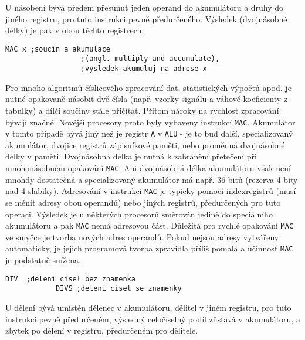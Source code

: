           U násobení bývá předem přesunut jeden operand do akumulátoru a druhý do jiného registru, 
          pro tuto instrukci pevně předurčeného. Výsledek (dvojnásobné délky) je pak v obou těchto 
          registrech.
          
          \begin{lstlisting}[style=luaMITASMStyle]
            MAC x ;soucin a akumulace 
                  ;(angl. multiply and accumulate), 
                  ;vysledek akumuluj na adrese x
          \end{lstlisting}
         
          Pro mnoho algoritmů číslicového zpracování dat, statistických výpočtů apod. je nutné
          opakovaně násobit dvě čísla (např. vzorky signálu a váhové koeficienty z tabulky) a dílčí
          součiny stále přičítat. Přitom nároky na rychlost zpracování bývají značné. Novější
          procesory proto byly vybaveny instrukcí \texttt{MAC}. Akumulátor v tomto případě bývá jiný
          než je registr \texttt{A} v \texttt{ALU} - je to buď další, specializovaný akumulátor,
          dvojice registrů zápisníkové paměti, nebo proměnná dvojnásobné délky v paměti. Dvojnásobná
          délka je nutná k zabránění přetečení při mnohonásobném opakování \texttt{MAC}. Ani
          dvojnásobná délka akumulátoru však není mnohdy dostatečná a specializovaný akumulátor má
          např. 36 bitů (rezerva 4 bity nad 4 slabiky). Adresování v instrukci \texttt{MAC} je
          typicky pomocí indexregistrů (musí se měnit adresy obou operandů) nebo jiných registrů,
          předurčených pro tuto operaci. Výsledek je u některých procesorů směrován jedině do
          speciálního akumulátoru a pak \texttt{MAC} nemá adresovou část. Důležitá pro rychlé
          opakování \texttt{MAC} ve smyčce je tvorba nových adres operandů. Pokud nejsou adresy
          vytvářeny automaticky, je jejich programová tvorba zpravidla příliš pomalá a účinnost
          \texttt{MAC} je podstatně snížena.
         
          \begin{lstlisting}[style=luaMITASMStyle]
            DIV  ;deleni cisel bez znamenka
            DIVS ;deleni cisel se znamenky
          \end{lstlisting}
       
          U dělení bývá umístěn dělenec v akumulátoru, dělitel v jiném registru, pro tuto instrukci 
          pevně předurčeném, výsledný celočíselný podíl zůstává v akumulátoru, a zbytek po dělení v 
          registru, předurčeném pro dělitele.
      

